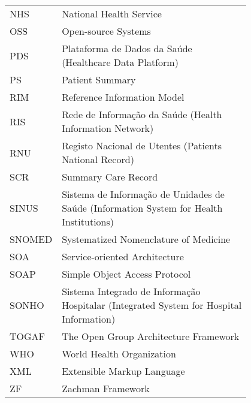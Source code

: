 \begin{flushleft}
\begin{tabular}{l p{0.8\linewidth}}
NHS		& National Health Service \\
OSS		& Open-source Systems \\
PDS		& Plataforma de Dados da Saúde (Healthcare Data Platform) \\
PS		& Patient Summary \\
RIM		& Reference Information Model \\
RIS		& Rede de Informação da Saúde (Health Information Network) \\
RNU		& Registo Nacional de Utentes (Patients National Record) \\
SCR		& Summary Care Record \\
SINUS	& Sistema de Informação de Unidades de Saúde (Information System for Health Institutions)\\
SNOMED	& Systematized Nomenclature of Medicine \\
SOA		& Service-oriented Architecture \\
SOAP	& Simple Object Access Protocol \\
SONHO	& Sistema Integrado de Informação Hospitalar (Integrated System for Hospital Information) \\
TOGAF   & The Open Group Architecture Framework \\
WHO		& World Health Organization \\
XML	    & Extensible Markup Language \\
ZF		& Zachman Framework 
\end{tabular}
\end{flushleft}

